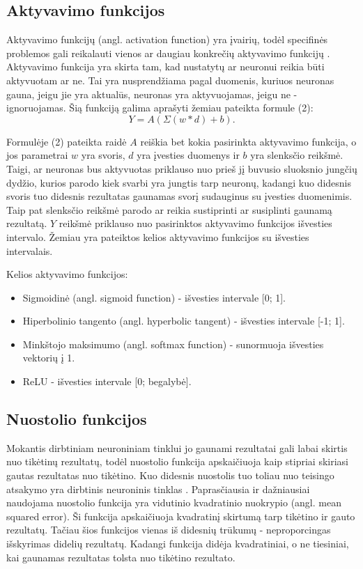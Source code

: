 \documentclass{VUMIFPSbakalaurinis}
\begin{document}
\subsection{Aktyvavimo funkcijos}
Aktyvavimo funkcijų (angl. activation function) yra įvairių, todėl specifinės problemos gali reikalauti vienos ar daugiau konkrečių aktyvavimo funkcijų \cite{activation}.
Aktyvavimo funkcija yra skirta tam, kad nustatytų ar neuronui reikia būti aktyvuotam ar ne. Tai yra nusprendžiama pagal duomenis, kuriuos neuronas gauna, jeigu jie yra aktualūs, neuronas yra aktyvuojamas, jeigu ne - ignoruojamas.
Šią funkciją galima aprašyti žemiau pateikta formule (2):
\begin{equation}
Y = A(\Sigma{(w * d) + b}).
\end{equation}

Formulėje (2) pateikta raidė \(A\) reiškia bet kokia pasirinkta aktyvavimo funkcija, o jos parametrai \(w\) yra svoris, \(d\) yra įvesties duomenys ir \(b\) yra slenksčio reikšmė. Taigi, ar neuronas bus aktyvuotas priklauso nuo prieš jį 
buvusio sluoksnio jungčių dydžio, kurios parodo kiek svarbi yra jungtis tarp neuronų, kadangi kuo didesnis svoris tuo didesnis rezultatas gaunamas svorį sudauginus su įvesties duomenimis. Taip pat slenksčio reikšmė parodo ar reikia 
sustiprinti ar susiplinti gaunamą rezultatą. \(Y\) reikšmė priklauso nuo pasirinktos aktyvavimo funkcijos išvesties intervalo. Žemiau yra pateiktos kelios aktyvavimo funkcijos su išvesties intervalais.  

Kelios aktyvavimo funkcijos:
\begin{itemize}
\item Sigmoidinė (angl. sigmoid function) - išvesties intervale [0; 1].
\item Hiperbolinio tangento (angl. hyperbolic tangent) - išvesties intervale [-1; 1].
\item Minkštojo maksimumo (angl. softmax function) - sunormuoja išvesties vektorių į 1.
\item ReLU - išvesties intervale [0; begalybė].
\end{itemize}

\subsection{Nuostolio funkcijos}
Mokantis dirbtiniam neuroniniam tinklui jo gaunami rezultatai gali labai skirtis nuo tikėtinų rezultatų, todėl nuostolio funkcija apskaičiuoja kaip stipriai
skiriasi gautas rezultatas nuo tikėtino. Kuo didesnis nuostolis tuo toliau nuo teisingo atsakymo yra dirbtinis neuroninis tinklas \cite{Cameron-loss-fun}.
Paprasčiausia ir dažniausiai naudojama nuostolio funkcija yra vidutinio kvadratinio nuokrypio (angl. mean squared error). Ši funkcija apskaičiuoja kvadratinį skirtumą tarp tikėtino 
ir gauto rezultatų. Tačiau šios funkcijos vienas iš didesnių trūkumų - neproporcingas išskyrimas didelių rezultatų. Kadangi funkcija didėja kvadratiniai,
o ne tiesiniai, kai gaunamas rezultatas tolsta nuo tikėtino rezultato.
\end{document}
